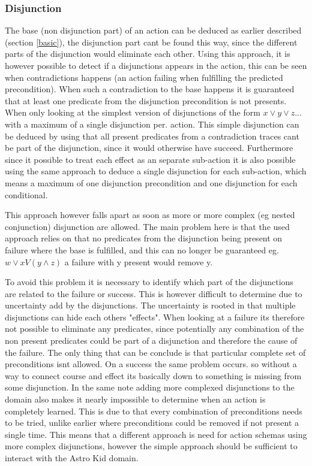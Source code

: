 \subsubsection{Disjunction}
	The base (non disjunction part) of an action can be deduced as earlier described (section \ref{basic}), the disjunction part cant be found this way, since the different parts of the disjunction would eliminate each other. Using this approach, it is however possible to detect if a disjunctions appears in the action, this can be seen when contradictions happens (an action failing when fulfilling the predicted precondition). When such a contradiction to the base happens it is guaranteed that at least one predicate from the disjunction precondition is not presents. When only looking at the simplest version of disjunctions of the form $ x \lor y \lor z...$ with a maximum of a single disjunction per. action. This simple disjunction can be deduced by using that all present predicates from a contradiction traces cant be part of the disjunction, since it would otherwise have succeed. Furthermore since it possible to treat each effect as an separate sub-action it is also possible using the same approach to deduce a single disjunction for each sub-action, which means a maximum of one disjunction precondition and one disjunction for each conditional. 
	
	This approach however falls apart as soon as more or more complex (eg nested conjunction) disjunction are allowed. The main problem here is that the used approach relies on that no predicates from the disjunction being present on failure where the base is fulfilled, and this can no longer be guaranteed eg. $w \lor x V (y \land z )$ a failure with y present would remove y. 
	
	To avoid this problem it is necessary to identify which part of the disjunctions are related to the failure or success. This is however difficult to determine due to uncertainty add by the disjunctions. The uncertainty is rooted in that multiple disjunctions can hide each others "effects". When looking at a failure its therefore not possible to eliminate any predicates, since potentially any combination of the non present predicates could be part of a disjunction and therefore the cause of the failure. The only thing that can be conclude is that particular complete set of preconditions isnt allowed. On a success the same problem occurs. so without a way to connect course and effect its basically down to something is missing from some disjunction. In the same note adding more complexed disjunctions to the domain also makes it nearly impossible to determine when an action is completely learned. This is due to that every combination of preconditions needs to be tried, unlike earlier where preconditions could be removed if not present a single time. This means that a different approach is need for action schemas using more complex disjunctions, however the simple approach should be sufficient to interact with the Astro Kid domain.
	 
